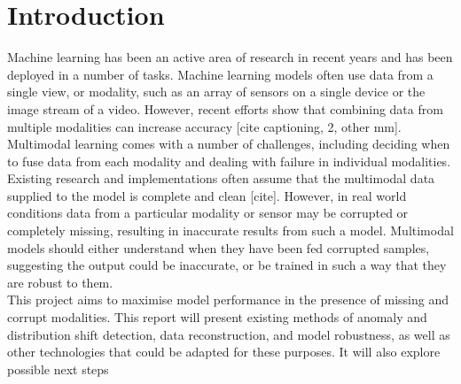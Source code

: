 \chapter{Introduction}
Machine learning has been an active area of research in recent years and has been deployed in a number of tasks. Machine learning models often use data from a single view, or modality, such as an array of sensors on a single device or the image stream of a video. However, recent efforts show that combining data from multiple modalities can increase accuracy [cite captioning, 2, other mm]. Multimodal learning comes with a number of challenges, including deciding when to fuse data from each modality and dealing with failure in individual modalities.\\

Existing research and implementations often assume that the multimodal data supplied to the model is complete and clean [cite]. However, in real world conditions data from a particular modality or sensor may be corrupted or completely missing, resulting in inaccurate results from such a model. Multimodal models should either understand when they have been fed corrupted samples, suggesting the output could be inaccurate, or be trained in such a way that they are robust to them.\\ 

This project aims to maximise model performance in the presence of missing and corrupt modalities. This report will present existing methods of anomaly and distribution shift detection, data reconstruction, and model robustness, as well as other technologies that could be adapted for these purposes. It will also explore possible next steps \\